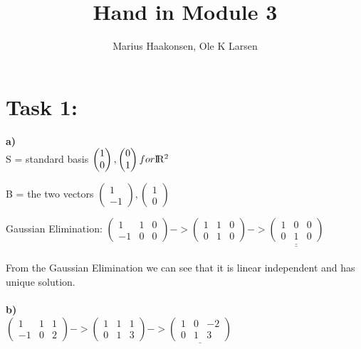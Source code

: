 \documentclass[11pt]{amsart}
\title{Hand in Module 3}
\author{Marius Haakonsen, Ole K Larsen}
\begin{document}
\maketitle

\section{Task 1:}

\textbf{a)}\\

S = standard basis $\begin{pmatrix} 1 \\ 0 \end{pmatrix} , \begin{pmatrix} 0 \\ 1 \end{pmatrix} for  {\rm I\!R^2}$


B = the two vectors $\begin{pmatrix} 1 \\ -1 \end{pmatrix} , \begin{pmatrix} 1 \\ 0 \end{pmatrix}$ 


Gaussian Elimination: $\begin{pmatrix} 1&1&0 \\ -1&0&0 \end{pmatrix} -> 
						\begin{pmatrix} 1&1&0 \\ 0&1&0 \end{pmatrix} ->
						\underline{\underline{\begin{pmatrix} 1&0&0 \\ 0&1&0 \end{pmatrix}}} $ \\\\

From the Gaussian Elimination we can see that it is linear independent and has unique solution. \\\\

\textbf{b)}\\

$\begin{pmatrix} 1&1&1 \\ -1&0&2 \end{pmatrix} -> 
\begin{pmatrix} 1&1&1 \\ 0&1&3 \end{pmatrix} ->
\underline{\begin{pmatrix} 1&0&-2 \\ 0&1&3 \end{pmatrix}} $ \\\\
\end{document}
